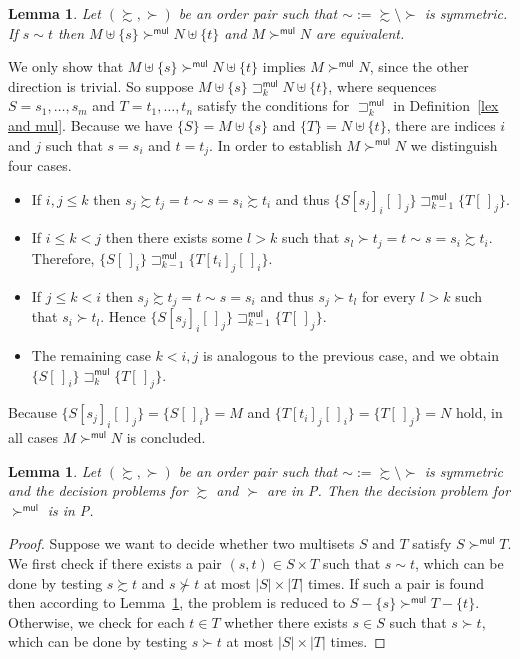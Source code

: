 \documentclass{tlp}
\newcommand{\qed}{\hspace*{1em}\hbox{\proofbox}}
\newtheorem{lemma}[theorem]{Lemma}
\newcommand{\m}[1]{\mathsf{#1}}
\newcommand{\mul}{\m{mul}}
\newcommand{\seq}[2][n]{{#2_1},\dots,{#2_{#1}}}
\newcommand{\GT}{\mathrel{\succ}}
\newcommand{\GS}{\mathrel{\succsim}}
\newcommand{\NGT}{\mathrel{\nsucc}}
\begin{document}
\begin{lemma}
\label{lem:equivalence}
Let $(\GS,\GT)$ be an order pair such that
${\sim} := {\GS} \setminus {\GT}$ is symmetric. If $s \sim t$ then
$M \mathrel{\uplus} \{ s \} \GT^\mul N \mathrel{\uplus} \{ t \}$
and $M \GT^\mul N$ are equivalent.
\end{lemma}
\begin{proof*}
We only show that
$M \mathrel{\uplus} \{ s \} \GT^\mul N \mathrel{\uplus} \{ t \}$
implies $M \GT^\mul N$, since the other direction is trivial.
So suppose
$M \uplus \{ s \} \sqsupset_k^\mul N \uplus \{ t \}$,
where sequences $S = \seq[m]{s}$ and $T = \seq{t}$ 
satisfy the conditions for $\sqsupset_k^\mul$
in Definition~\ref{lex and mul}.
Because we have $\{S\} = M \uplus \{s\}$ and
$\{T\} = N \uplus \{t\}$, there are indices $i$ and $j$ such that
$s = s_i$ and $t = t_j$.
In order to establish $M \GT^\mul N$ we distinguish four cases.
\begin{itemize}
\item
If $i, j \leqslant k$ then
$s_j \GS t_j = t \sim s = s_i \GS t_i$ and thus
\( \{ S[s_j]_i[\,]_j \} \sqsupset_{k-1}^\mul 
\{ T[\,]_j \}
\).
\smallskip
\item
If $i \leqslant k < j$ then
there exists some $l > k$ such that
$s_l \GT t_j = t \sim s = s_i \GS t_i$.
Therefore,
$\{ S[\,]_i \} \sqsupset_{k-1}^\mul \{ T[t_i]_j[\,]_i \}$.
\smallskip
\item
If $j \leqslant k < i$ then
$s_j \GS t_j = t \sim s = s_i$ and thus
$s_j \GT t_l$ for every $l > k$ such that $s_i \GT t_l$.
Hence $\{ S[s_j]_i[\,]_j \} \sqsupset_{k-1}^\mul \{ T[\,]_j \}$.
\smallskip
\item
The remaining case $k < i, j$ is analogous to the previous
case, and we obtain
$\{ S[\,]_i \} \sqsupset_k^\mul \{ T[\,]_j \}$.
\end{itemize}
Because $\{ S[s_j]_i[\,]_j \} = \{ S[\,]_i \} = M$ and
$\{ T[t_i]_j[\,]_i \} = \{ T[\,]_j \} = N$ hold,
in all cases $M \GT^\mul N$ is concluded.
\qed
\end{proof*}

\begin{lemma}
\label{thm:P}
Let $(\GS,\GT)$ be an order pair such that 
${\sim} := {\GS} \setminus {\GT}$ is symmetric
and the decision problems for $\GS$ and $\GT$ are in P.
Then the decision problem for $\GT^\mul$ is in P.
\end{lemma}
\begin{proof}
Suppose we want to decide whether two multisets $S$ and $T$ satisfy
$S \GT^\mul T$.
We first check if there exists a pair $(s,t) \in S \times T$ such that
$s \sim t$, which can be done by testing $s \GS t$ and $s \NGT t$ at most
$|S| \times |T|$ times. If such a pair is found then according to
Lemma~\ref{lem:equivalence}, the problem is reduced to
$S - \{ s \} \GT^\mul T - \{ t \}$.  
Otherwise, we check for each $t \in T$ whether there exists $s \in S$ such
that $s \GT t$, which can be done by testing $s \GT t$ at most
$|S| \times |T|$ times.
\end{proof}
\end{document}
